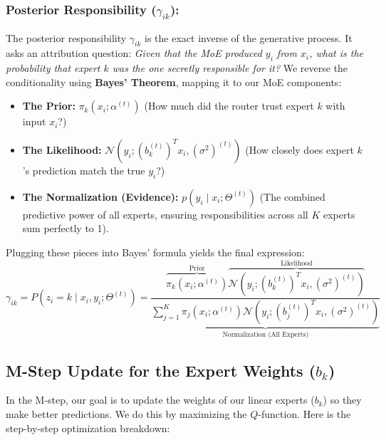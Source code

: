 \documentclass[twoside, 10pt]{article}
\begin{document}
\subsubsection{Posterior Responsibility ($\gamma_{ik}$):}
The posterior responsibility $\gamma_{ik}$ is the exact inverse of the generative process. It asks an attribution question: \textit{Given that the MoE produced $y_i$ from $x_i$, what is the probability that expert $k$ was the one secretly responsible for it?}
We reverse the conditionality using \textbf{Bayes' Theorem}, mapping it to our MoE components:
\begin{itemize}
    \item \textbf{The Prior:} $\pi_k(x_i; \alpha^{(t)})$ (How much did the router trust expert $k$ with input $x_i$?)
    \item \textbf{The Likelihood:} $\mathcal{N}(y_i; (b_k^{(t)})^T x_i, (\sigma^2)^{(t)})$ (How closely does expert $k$'s prediction match the true $y_i$?)
    \item \textbf{The Normalization (Evidence):} $p(y_i \mid x_i; \Theta^{(t)})$ (The combined predictive power of all experts, ensuring responsibilities across all $K$ experts sum perfectly to 1).
\end{itemize}
Plugging these pieces into Bayes' formula yields the final expression:
\[
\gamma_{ik} = P(z_i = k \mid x_i, y_i; \Theta^{(t)}) = \frac{\overbrace{\pi_k(x_i; \alpha^{(t)})}^{\text{Prior}} \overbrace{\mathcal{N}(y_i; (b_k^{(t)})^T x_i, (\sigma^2)^{(t)})}^{\text{Likelihood}}}{\underbrace{\sum_{j=1}^K \pi_j(x_i; \alpha^{(t)}) \mathcal{N}(y_i; (b_j^{(t)})^T x_i, (\sigma^2)^{(t)})}_{\text{Normalization (All Experts)}}}
\]
\subsection{M-Step Update for the Expert Weights ($b_k$)}
In the M-step, our goal is to update the weights of our linear experts ($b_k$) so they make better predictions. We do this by maximizing the $Q$-function. Here is the step-by-step optimization breakdown:
\end{document}
